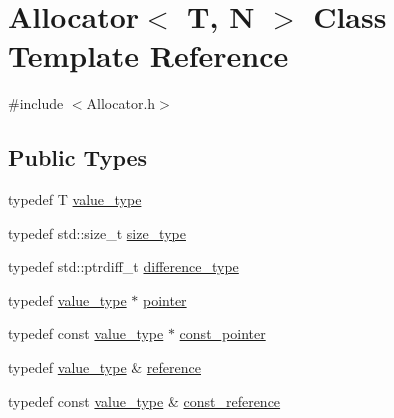\hypertarget{classAllocator}{\section{Allocator$<$ T, N $>$ Class Template Reference}
\label{classAllocator}
}


{\ttfamily \#include $<$Allocator.\-h$>$}

\subsection*{Public Types}
\begin{DoxyCompactItemize}
\item 
typedef T \hyperlink{classAllocator_ad5c51a128db2150e67259f697ef457b9}{value\-\_\-type}
\item 
typedef std\-::size\-\_\-t \hyperlink{classAllocator_aec4c70d3e80d2b7d11bbb8bd8a62f016}{size\-\_\-type}
\item 
typedef std\-::ptrdiff\-\_\-t \hyperlink{classAllocator_a6b650764260187e63d5098f5f38046c2}{difference\-\_\-type}
\item 
typedef \hyperlink{classAllocator_ad5c51a128db2150e67259f697ef457b9}{value\-\_\-type} $\ast$ \hyperlink{classAllocator_a7df4693123ad6d168217e3853cd15495}{pointer}
\item 
typedef const \hyperlink{classAllocator_ad5c51a128db2150e67259f697ef457b9}{value\-\_\-type} $\ast$ \hyperlink{classAllocator_a5815a9c01f756005eb19d0ae5aded3be}{const\-\_\-pointer}
\item 
typedef \hyperlink{classAllocator_ad5c51a128db2150e67259f697ef457b9}{value\-\_\-type} \& \hyperlink{classAllocator_adf0658602f352de03fa2d2c4f23903e9}{reference}
\item 
typedef const \hyperlink{classAllocator_ad5c51a128db2150e67259f697ef457b9}{value\-\_\-type} \& \hyperlink{classAllocator_aff863afcf191fb225997ae2d51314bf5}{const\-\_\-reference}
\end{DoxyCompactItemize}
